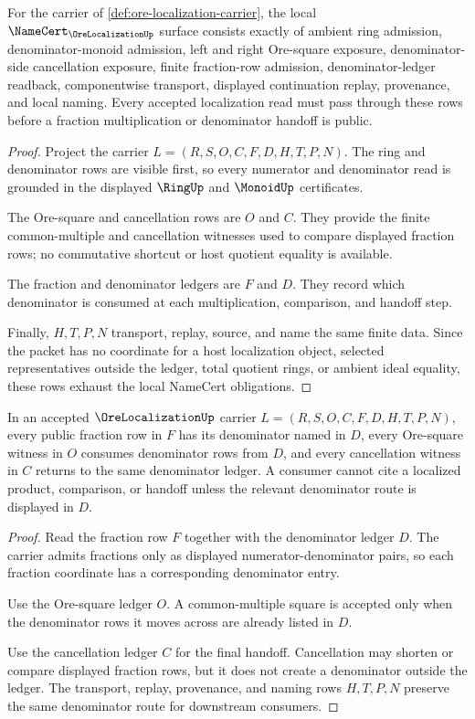 \begin{theorem}
\label{thm:ore-localization-namecert-obligations}
For the carrier of \autoref{def:ore-localization-carrier}, the local $\NameCert_{\OreLocalizationUp}$ surface consists exactly of ambient ring admission, denominator-monoid admission, left and right Ore-square exposure, denominator-side cancellation exposure, finite fraction-row admission, denominator-ledger readback, componentwise transport, displayed continuation replay, provenance, and local naming. Every accepted localization read must pass through these rows before a fraction multiplication or denominator handoff is public.
\end{theorem}
\begin{proof}
Project the carrier $L=(R,S,O,C,F,D,H,T,P,N)$. The ring and denominator rows are visible first, so every numerator and denominator read is grounded in the displayed $\RingUp$ and $\MonoidUp$ certificates.

The Ore-square and cancellation rows are $O$ and $C$. They provide the finite common-multiple and cancellation witnesses used to compare displayed fraction rows; no commutative shortcut or host quotient equality is available.

The fraction and denominator ledgers are $F$ and $D$. They record which denominator is consumed at each multiplication, comparison, and handoff step.

Finally, $H,T,P,N$ transport, replay, source, and name the same finite data. Since the packet has no coordinate for a host localization object, selected representatives outside the ledger, total quotient rings, or ambient ideal equality, these rows exhaust the local NameCert obligations.
\end{proof}

\begin{theorem}
\label{thm:ore-localization-denominator-ledger}
In an accepted $\OreLocalizationUp$ carrier $L=(R,S,O,C,F,D,H,T,P,N)$, every public fraction row in $F$ has its denominator named in $D$, every Ore-square witness in $O$ consumes denominator rows from $D$, and every cancellation witness in $C$ returns to the same denominator ledger. A consumer cannot cite a localized product, comparison, or handoff unless the relevant denominator route is displayed in $D$.
\end{theorem}
\begin{proof}
Read the fraction row $F$ together with the denominator ledger $D$. The carrier admits fractions only as displayed numerator-denominator pairs, so each fraction coordinate has a corresponding denominator entry.

Use the Ore-square ledger $O$. A common-multiple square is accepted only when the denominator rows it moves across are already listed in $D$.

Use the cancellation ledger $C$ for the final handoff. Cancellation may shorten or compare displayed fraction rows, but it does not create a denominator outside the ledger. The transport, replay, provenance, and naming rows $H,T,P,N$ preserve the same denominator route for downstream consumers.
\end{proof}

